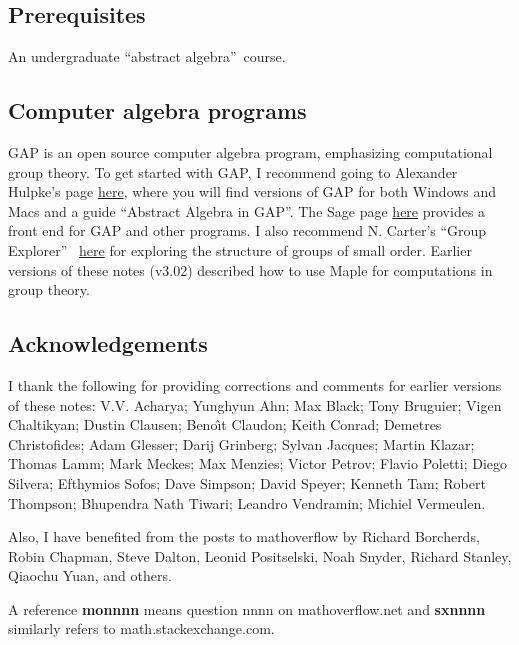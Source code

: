 \documentclass[a4paper,11pt,final]{memoir}%
\theoremstyle{nonumberplain}
\begin{document}
\subsection{Prerequisites}

An undergraduate \textquotedblleft abstract algebra\textquotedblright\ course.

\subsection{Computer algebra programs}

GAP is an open source computer algebra program, emphasizing computational
group theory. To get started with GAP, I recommend going to Alexander Hulpke's
page \href{http://www.math.colostate.edu/~hulpke/CGT/education.html}{here},
where you will find versions of GAP for both Windows and Macs and a guide
\textquotedblleft Abstract Algebra in GAP\textquotedblright. The Sage page
\href{http://www.sagemath.org/}{here} provides a front end for GAP and other
programs. I also recommend N. Carter's \textquotedblleft Group
Explorer\textquotedblright%
\ \href{https://nathancarter.github.io/group-explorer/index.html}{here} for
exploring the structure of groups of small order. Earlier versions of these
notes (v3.02) described how to use Maple for computations in group theory.

\subsection{Acknowledgements}

\bsmall
I thank the following for providing corrections and comments for earlier
versions of these notes: V.V. Acharya; Yunghyun Ahn; Max Black; Tony Bruguier; Vigen
Chaltikyan; Dustin Clausen; Beno\^{\i}t Claudon; Keith Conrad; Demetres
Christofides; Adam Glesser; Darij Grinberg; Sylvan Jacques; Martin Klazar;
Thomas Lamm; Mark Meckes; Max Menzies; Victor Petrov; Flavio Poletti; Diego Silvera;
Efthymios Sofos; Dave Simpson; David Speyer; Kenneth Tam; Robert Thompson;
Bhupendra Nath Tiwari; Leandro Vendramin; Michiel Vermeulen.

Also, I have benefited from the posts to mathoverflow by Richard Borcherds,
Robin Chapman, Steve Dalton, Leonid Positselski, Noah Snyder, Richard Stanley,
Qiaochu Yuan, and others.

A reference \textbf{monnnn} means question nnnn on mathoverflow.net and
\textbf{sxnnnn} similarly refers to math.stackexchange.com. \esmall
\end{document}
